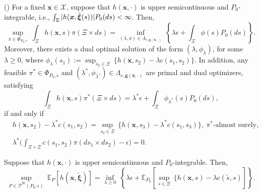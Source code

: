 \documentclass[final,onefignum,onetabnum]{class}
\newcommand{\ee}[2]{\mathbb{E}_{#1} \left[ #2 \right]}
\newcommand{\bs}[1]{\boldsymbol{#1}} %
\newcommand{\Cs}[1]{\mathcal{#1}} %
\newcommand{\txi}{\tilde{\bs{\xi}}}
\begin{document}
\begin{theorem}{(\citet[Theorem~1]{blanchet2017DRO})}
    \label{thm: rev.opt_transport_duality} 
    For a fixed $\bs{x} \in \Cs{X}$, suppose that $h(\bs{x}, \cdot)$ is upper semicontinuous and $P_{0}$-integrable, i.e., $\int_{\Xi} |h(\bs{x}, \txi(s))| P_{0}(ds) \linebreak < \infty$. Then, 
    $$\sup_{\pi \in \Phi_{P_{0}, \epsilon} }  \ \int_{\Xi} h(\bs{x},s) \pi(\Xi \times d s) = \inf_{(\lambda, \phi) \in \Lambda_{c,\bs{g}(\bs{x}, \cdot)} } \  \left\lbrace  \lambda \epsilon +  \int_{\Xi} \phi(s)  P_{0}(ds) \right\rbrace.$$
    Moreover, there exists a dual optimal solution of the form $(\lambda, \phi_{\lambda})$, for some $\lambda \ge 0$, where $\phi_{\lambda}(s_{1}):=\sup_{s_2 \in \Xi} \ \{h(\bs{x},s_{2})- \lambda c(s_{1},s_{2}) \}$. In addition, any feasible $\pi^{*} \in \Phi_{P_{0},\epsilon}$ and $(\lambda^{*}, \phi_{\lambda^{*}}) \in \Lambda_{c,\bs{g}(\bs{x}, \cdot)}$ are primal and dual optimizers, satisfying 
    $$ \int_{\Xi} h(\bs{x},s) \pi^{*}(\Xi \times d s) = \lambda^{*} \epsilon +  \int_{\Xi} \phi_{\lambda^{*}}(s)  P_{0}(ds),$$ if and only if 
    \begin{subequations}
    \label{eq: rev.opt_trasnport_conditions}
    \begin{align}
        & h(\bs{x},s_{2})- \lambda^{*} c(s_{1},s_{2})= \sup_{s_{3} \in \Xi} \ \{h(\bs{x},s_{3})- \lambda^{*} c(s_{1},s_{3}) \}, \ \pi^{*}\text{-almost surely},\\
        & \lambda^{*} \Big( \int_{\Xi\times \Xi} c(s_1,s_2) \pi(d s_1\times d s_2) - \epsilon \Big)=0.
    \end{align}
    \end{subequations}
\end{theorem}

\begin{corollary}
    \label{cor: rev.opt_transport_duality} 
    Suppose that $h(\bs{x}, \cdot)$ is upper semicontinuous and $P_{0}$-integrable. Then, 
    \begin{equation}
    \label{eq: rev.opt_transport_duality_final}
    \sup_{P \in \Cs{P}^{\text{W}}(P_{0}; \epsilon)} \ \ee{P}{h(\bs{x},\txi)}=   \inf_{\lambda \ge 0} \ \left\lbrace \lambda \epsilon +  \ee{P_{0}}{\sup_{s \in \Xi} \ \{h(\bs{x},s)- \lambda c(\tilde{s},s)} \right\rbrace.
\end{equation}
\end{corollary}
\end{document}
